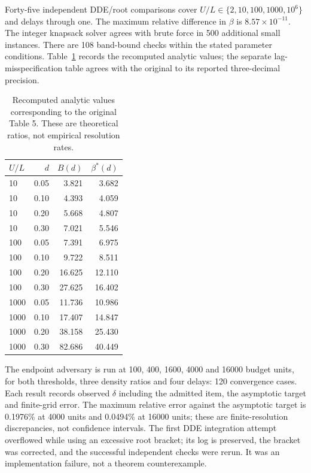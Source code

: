\documentclass[11pt]{article}
\begin{document}
Forty-five independent DDE/root comparisons cover $U/L\in\{2,10,100,1000,10^6\}$ and delays through one. The maximum relative difference in $\beta$ is $8.57\times10^{-11}$. The integer knapsack solver agrees with brute force in 500 additional small instances. There are 108 band-bound checks within the stated parameter conditions. Table~\ref{tab:theory} records the recomputed analytic values; the separate lag-misspecification table agrees with the original to its reported three-decimal precision.
\begin{table}[tbp]\centering\small
\caption{Recomputed analytic values corresponding to the original Table 5. These are theoretical ratios, not empirical resolution rates.}\label{tab:theory}
\begin{tabular}{lrrr}
\toprule
$U/L$ & $d$ & $B(d)$ & $\beta^*(d)$ \\ \midrule
10 & 0.05 & 3.821 & 3.682 \\
10 & 0.10 & 4.393 & 4.059 \\
10 & 0.20 & 5.668 & 4.807 \\
10 & 0.30 & 7.021 & 5.546 \\
100 & 0.05 & 7.391 & 6.975 \\
100 & 0.10 & 9.722 & 8.511 \\
100 & 0.20 & 16.625 & 12.110 \\
100 & 0.30 & 27.625 & 16.402 \\
1000 & 0.05 & 11.736 & 10.986 \\
1000 & 0.10 & 17.407 & 14.847 \\
1000 & 0.20 & 38.158 & 25.430 \\
1000 & 0.30 & 82.686 & 40.449 \\
\bottomrule\end{tabular}\end{table}
The endpoint adversary is run at 100, 400, 1600, 4000 and 16000 budget units, for both thresholds, three density ratios and four delays: 120 convergence cases. Each result records observed $\delta$ including the admitted item, the asymptotic target and finite-grid error. The maximum relative error against the asymptotic target is 0.1976\% at 4000 units and 0.0494\% at 16000 units; these are finite-resolution discrepancies, not confidence intervals. The first DDE integration attempt overflowed while using an excessive root bracket; its log is preserved, the bracket was corrected, and the successful independent checks were rerun. It was an implementation failure, not a theorem counterexample.
\end{document}

